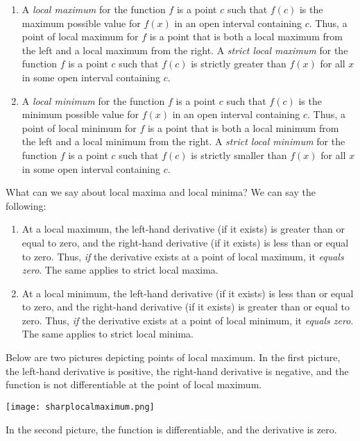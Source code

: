 \documentclass{amsart}
\begin{document}
\begin{enumerate}
\item A {\em local maximum} for the function $f$ is a point $c$ such
  that $f(c)$ is the maximum possible value for $f(x)$ in an open
  interval containing $c$. Thus, a point of local maximum for $f$ is a
  point that is both a local maximum from the left and a local maximum
  from the right. A {\em strict local maximum} for the function $f$ is
  a point $c$ such that $f(c)$ is strictly greater than $f(x)$ for all
  $x$ in some open interval containing $c$.
\item A {\em local minimum} for the function $f$ is a point $c$ such
  that $f(c)$ is the minimum possible value for $f(x)$ in an open
  interval containing $c$. Thus, a point of local minimum for $f$ is a
  point that is both a local minimum from the left and a local minimum
  from the right. A {\em strict local minimum} for the function $f$ is
  a point $c$ such that $f(c)$ is strictly smaller than $f(x)$ for all
  $x$ in some open interval containing $c$.
\end{enumerate}

What can we say about local maxima and local minima? We can say the
following:

\begin{enumerate}
\item At a local maximum, the left-hand derivative (if it exists) is
  greater than or equal to zero, and the right-hand derivative (if it
  exists) is less than or equal to zero. Thus, {\em if} the derivative
  exists at a point of local maximum, it {\em equals zero}. The same
  applies to strict local maxima.
\item At a local minimum, the left-hand derivative (if it exists) is
  less than or equal to zero, and the right-hand derivative (if it
  exists) is greater than or equal to zero. Thus, {\em if} the
  derivative exists at a point of local minimum, it {\em equals
  zero}. The same applies to strict local minima.
\end{enumerate}

Below are two pictures depicting points of local maximum. In the first
picture, the left-hand derivative is positive, the right-hand
derivative is negative, and the function is not differentiable at the
point of local maximum. 

\texttt{[image: sharplocalmaximum.png]}

In the second picture, the function is differentiable, and the
derivative is zero.
\end{document}
